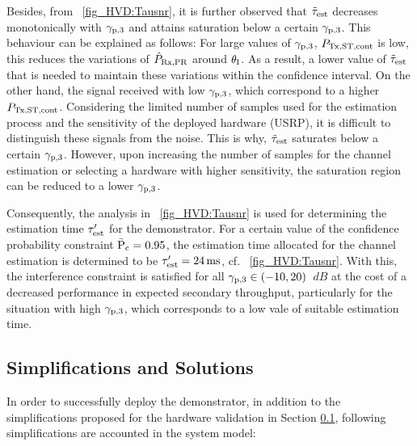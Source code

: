 Besides, from \figurename~\ref{fig_HVD:Tausnr}, it is further observed that $\tilde{\tau}_{\text{est}}$ decreases monotonically with ${\gamma}_{\text{p,3}}$ and attains saturation below a certain ${\gamma}_{\text{p,3}}$. %
This behaviour can be explained as follows: For large values of ${\gamma}_{\text{p,3}}$, $P_{\text{Tx,ST,cont}}$ is low, this reduces the variations of $\hat{P}_{\text{Rx,PR}}$ around $\theta_{\text{I}}$. As a result, a lower value of $\tilde{\tau}_{\text{est}}$ that is needed to maintain these variations within the confidence interval. On the other hand, the signal received with low ${\gamma}_{\text{p,3}}$, which correspond to a higher $P_{\text{Tx,ST,cont}}$. Considering the limited number of samples used for the estimation process and the sensitivity of the deployed hardware (USRP), it is difficult to distinguish these signals from the noise. This is why, $\tilde{\tau}_{\text{est}}$ saturates below a certain ${\gamma}_{\text{p,3}}$. However, upon increasing the number of samples for the channel estimation or selecting a hardware with higher sensitivity, the saturation region can be reduced to a lower ${\gamma}_{\text{p,3}}$. 

Consequently, the analysis in \figurename~\ref{fig_HVD:Tausnr} is used for determining the estimation time ${\tau}\sp{\prime}_{\text{est}}$ for the demonstrator. For a certain value of the confidence probability constraint $\bar{\text{P}}_{\text{c}} = 0.95$, the estimation time allocated for the channel estimation is determined to be ${\tau}\sp{\prime}_{\text{est}} = \SI{24}{ms}$, cf. \figurename~\ref{fig_HVD:Tausnr}. With this, the interference constraint is satisfied for all ${\gamma}_{\text{p,3}} \in (-10,20)$ $\SI{}{dB}$ at the cost of a decreased performance in expected secondary throughput, particularly for the situation with high ${\gamma}_{\text{p,3}}$, which corresponds to a low vale of suitable estimation time.


\subsection{Simplifications and Solutions} \label{ssec:simp2}
In order to successfully deploy the demonstrator, in addition to the simplifications proposed for the hardware validation in Section \ref{ssec:simp2}, following simplifications are accounted in the system model: 


